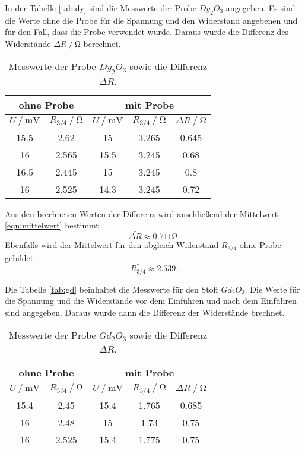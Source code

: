 In der Tabelle \eqref{tab:dy} sind die Messwerte der Probe $Dy_2O_3$ angegeben. Es sind die 
Werte ohne die Probe für die Spannung und den Widerstand angebenen und für den Fall, dass die Probe
verwendet wurde. Daraus wurde die Differenz des Widerstände $\Delta R\mathbin{/}\si{\ohm}$ berechnet.

\begin{table}
  \centering
  \caption{Messwerte der Probe $Dy_2O_3$ sowie die Differenz $\Delta R$.}
  \label{tab:dy}
\begin{tabular}{c c | c c | c}
  \hline
  \multicolumn{2}{c}{ohne Probe} & \multicolumn{3}{c}{mit Probe} \\
  \hline
  $U\mathbin{/} \si{\mV}$ & $R_{3/4}\mathbin{/} \si{\ohm}$ & $U\mathbin{/} \si{\mV}$ & $R_{3/4}\mathbin{/} \si{\ohm}$ & $\Delta R\mathbin{/}\si{\ohm}$ \\
  \hline
  15.5  & 2.62 & 15    & 3.265 & 0.645\\
  16  & 2.565 & 15.5   & 3.245 & 0.68\\
  16.5 & 2.445 & 15   & 3.245 & 0.8\\
  16  & 2.525 & 14.3   & 3.245 & 0.72\\
  \bottomrule
  \end{tabular}
\end{table}

Aus den brechneten Werten der Differenz wird anschließend der Mittelwert \eqref{eqn:mittelwert} bestimmt
\begin{equation*}
  \bar{\Delta R} \approx 0.711 \si{\ohm}.
\end{equation*}
Ebenfalls wird der Mittelwert für den abgleich Widerstand $R_{3/4}$ ohne Probe gebildet
\begin{equation*}
  \bar{R_{3/4}} \approx 2.539.
\end{equation*}

Die Tabelle \eqref{tab:gd} beinhaltet die Messwerte für den Stoff $Gd_2O_3$. Die Werte für die Spannung und die Widerstände
vor dem Einführen und nach dem Einführen sind angegeben. Daraus wurde dann die Differenz der Widerstände brechnet. 
\begin{table}
  \centering
  \caption{Messwerte der Probe $Gd_2O_3$ sowie die Differenz $\Delta R$.}
  \label{tab:gd}
\begin{tabular}{c c | c c | c}
  \hline
  \multicolumn{2}{c}{ohne Probe} & \multicolumn{3}{c}{mit Probe} \\
  \hline
  $U\mathbin{/} \si{\mV}$ & $R_{3/4}\mathbin{/} \si{\ohm}$ & $U\mathbin{/} \si{\mV}$ & $R_{3/4}\mathbin{/} \si{\ohm}$ & $\Delta R\mathbin{/}\si{\ohm}$ \\
  \hline
  15.4 & 2.45 & 15.4  & 1.765 & 0.685\\
  16  & 2.48 & 15  & 1.73 & 0.75\\
  16 & 2.525& 15.4  & 1.775 & 0.75\\
  \bottomrule
  \end{tabular}
\end{table}


